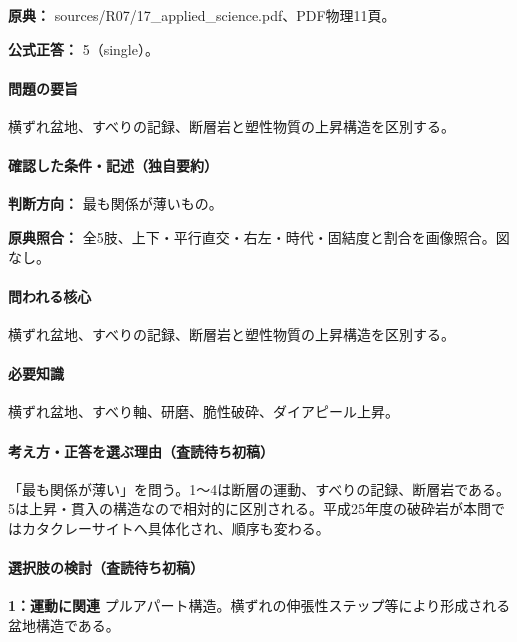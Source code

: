 \noindent\textbf{原典：} sources/R07/17\_applied\_science.pdf、PDF物理11頁。

\textbf{公式正答：} 5（single）。

\paragraph{問題の要旨} 横ずれ盆地、すべりの記録、断層岩と塑性物質の上昇構造を区別する。

\paragraph{確認した条件・記述（独自要約）}\mbox{}\par

\noindent\textbf{判断方向：} 最も関係が薄いもの。\par

\noindent\textbf{原典照合：} 全5肢、上下・平行直交・右左・時代・固結度と割合を画像照合。図なし。\par

\paragraph{問われる核心} 横ずれ盆地、すべりの記録、断層岩と塑性物質の上昇構造を区別する。

\paragraph{必要知識} 横ずれ盆地、すべり軸、研磨、脆性破砕、ダイアピール上昇。

\paragraph{考え方・正答を選ぶ理由（査読待ち初稿）} 「最も関係が薄い」を問う。1〜4は断層の運動、すべりの記録、断層岩である。5は上昇・貫入の構造なので相対的に区別される。平成25年度の破砕岩が本問ではカタクレーサイトへ具体化され、順序も変わる。

\paragraph{選択肢の検討（査読待ち初稿）}\mbox{}\par

\noindent\textbf{1：運動に関連} プルアパート構造。横ずれの伸張性ステップ等により形成される盆地構造である。\par

